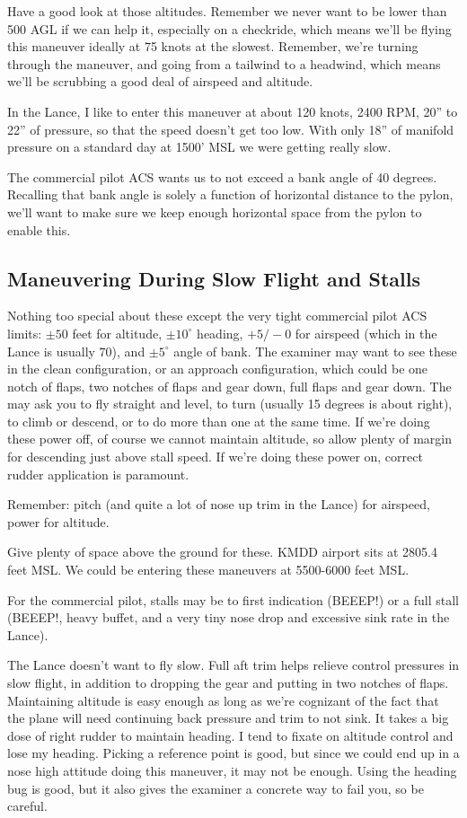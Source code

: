 Have a good look at those altitudes. Remember we never want to be lower than 500 AGL if we can help it, especially on a checkride, which means we'll be flying this maneuver ideally at 75 knots at the slowest. Remember, we're turning through the maneuver, and going from a tailwind to a headwind, which means we'll be scrubbing a good deal of airspeed and altitude.

In the Lance, I like to enter this maneuver at about 120 knots, 2400 RPM, 20'' to 22'' of pressure, so that the speed doesn't get too low. With only 18'' of manifold pressure on a standard day at 1500' MSL we were getting really slow.

The commercial pilot ACS wants us to not exceed a bank angle of 40 degrees. Recalling that bank angle is solely a function of horizontal distance to the pylon, we'll want to make sure we keep enough horizontal space from the pylon to enable this.


\subsection{Maneuvering During Slow Flight and Stalls}

Nothing too special about these except the very tight commercial pilot ACS limits: $\pm50$ feet for altitude, $\pm10^\circ$ heading, $+5/-0$ for airspeed (which in the Lance is usually 70), and $\pm5^\circ$ angle of bank. The examiner may want to see these in the clean configuration, or an approach configuration, which could be one notch of flaps, two notches of flaps and gear down, full flaps and gear down. The may ask you to fly straight and level, to turn (usually 15 degrees is about right), to climb or descend, or to do more than one at the same time. If we're doing these power off, of course we cannot maintain altitude, so allow plenty of margin for descending just above stall speed. If we're doing these power on, correct rudder application is paramount.

Remember: pitch (and quite a lot of nose up trim in the Lance) for airspeed, power for altitude.

Give plenty of space above the ground for these. KMDD airport sits at 2805.4 feet MSL. We could be entering these maneuvers at 5500-6000 feet MSL.

For the commercial pilot, stalls may be to first indication (BEEEP!) or a full stall (BEEEP!, heavy buffet, and a very tiny nose drop and excessive sink rate in the Lance).

The Lance doesn't want to fly slow. Full aft trim helps relieve control pressures in slow flight, in addition to dropping the gear and putting in two notches of flaps. Maintaining altitude is easy enough as long as we're cognizant of the fact that the plane will need continuing back pressure and trim to not sink. It takes a big dose of right rudder to maintain heading. I tend to fixate on altitude control and lose my heading. Picking a reference point is good, but since we could end up in a nose high attitude doing this maneuver, it may not be enough. Using the heading bug is good, but it also gives the examiner a concrete way to fail you, so be careful.

